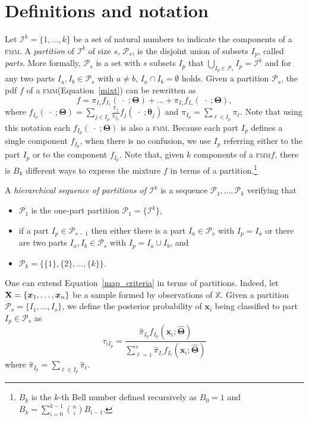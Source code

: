 \documentclass[submit]{smj}
\theoremstyle{definition}
\newcommand{\m}[1]{\boldsymbol{#1}}
\newcommand{\fmm}{\textsc{fmm}\xspace}
\newcommand{\X}{\text{\textbf{X}}}
\begin{document}
\section{Definitions and notation}\label{definitions}

%
Let $\mathcal{I}^k = \{1, \dots, k\}$ be a set of natural numbers to indicate the components of a \fmm. A \emph{partition} of $\mathcal{I}^k$ of size $s$, $\mathcal{P}_s$, is the disjoint union of subsets $I_p$, called \emph{parts}. More formally, $\mathcal{P}_s$ is a set with $s$ subsets $I_p$  that $\bigcup_{I_p \in \mathcal{P}_s} I_p = \mathcal{I}^k$ and for any two parts $I_a, I_b \in \mathcal{P}_s$ with $a \neq b$, $I_a \cap I_b = \emptyset$ holds. Given a partition  $\mathcal{P}_s$, the pdf $f$ of a \fmm (Equation~\ref{mixt}) can be rewritten as
\begin{equation}
f = \pi_{I_1} f_{I_1}(\;\cdot\;; \m\Theta) + \dots + \pi_{I_s} f_{I_s}(\;\cdot\;; \m\Theta),
\label{mixt_part}
\end{equation}
where $f_{I_p}(\;\cdot\;;  \m\Theta) = \sum_{j \in I_p} \frac{\pi_j}{\pi_{I_p}} f_j(\;\cdot\; ; \m\theta_j)$ and $\pi_{I_p} = \sum_{\ell \in I_p} \pi_\ell$. Note that using this notation each $f_{I_p}(\;\cdot\;;  \m\Theta)$ is also a \fmm. Because each part $I_p$ defines a single component $f_{I_p}$, when there is no confusion, we use $I_p$ referring either to the part $I_p$ or to the component $f_{I_p}$. Note that, given $k$ components of a \fmm $f$, there is $B_k$ different ways to express the mixture  $f$ in terms of a partition.\footnote{$B_k$ is the $k$-th Bell number defined recursively as $B_0 = 1$ and $B_k = \sum_{i=0}^{k-1} \binom ni B_{i-1}$.}



A \emph{hierarchical sequence of partitions of $\mathcal{I}^k$} is a sequence $\mathcal{P}_1, \dots, \mathcal{P}_k$ verifying that
\begin{itemize}
\item $\mathcal{P}_1$ is the one-part partition $\mathcal{P}_1 = \{ \mathcal{I}^k \}$,
\item if a part $I_p \in \mathcal{P}_{s-1}$ then either there is a part $I_a \in \mathcal{P}_{s}$ with $I_p = I_a$ or there are two parts $I_a, I_b \in \mathcal{P}_s$ with $I_p = I_a \cup I_b$, and
\item $\mathcal{P}_k= \{ \{1\},\{2\}, \dots, \{k\} \}$.
\end{itemize}



One can extend Equation~\ref{map_criteria} in terms of partitions. Indeed, let $\X = \{\m x_1,\dots, \m x_n\}$ be a sample formed by observations of $\mathbb{X}$. Given a partition $\mathcal{P}_s = \{ I_1, \dots, I_s \}$, we define the posterior probability of $\m x_i$ being classified to part $I_p\in \mathcal{P}_{s}$ as
\[
\tau_{i I_p} =  \frac{ \hat{\pi}_{I_p} f_{I_p}(\m x_i; \hat{\m\Theta}) }{\sum_{\ell=1}^s \hat{\pi}_{I_\ell} f_{I_\ell}(\m x_i; \hat{\m\Theta})}
\]
where $\hat{\pi}_{I_p} = \sum_{\ell \in I_p} \hat{\pi}_\ell$.
\end{document}
